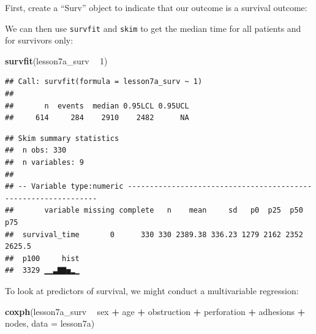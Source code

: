 \documentclass[]{book}
\newenvironment{Shaded}{\begin{snugshade}}{\end{snugshade}}
\newcommand{\DataTypeTok}[1]{\textcolor[rgb]{0.13,0.29,0.53}{#1}}
\newcommand{\DecValTok}[1]{\textcolor[rgb]{0.00,0.00,0.81}{#1}}
\newcommand{\KeywordTok}[1]{\textcolor[rgb]{0.13,0.29,0.53}{\textbf{#1}}}
\newcommand{\NormalTok}[1]{#1}
\newcommand{\OperatorTok}[1]{\textcolor[rgb]{0.81,0.36,0.00}{\textbf{#1}}}
\newcommand{\StringTok}[1]{\textcolor[rgb]{0.31,0.60,0.02}{#1}}
\begin{document}
First, create a ``Surv'' object to indicate that our outcome is a survival outcome:

\begin{Shaded}
\end{Shaded}

We can then use \texttt{survfit} and \texttt{skim} to get the median time for all patients and for survivors only:

\begin{Shaded}
\begin{Highlighting}[]
\KeywordTok{survfit}\NormalTok{(lesson7a_surv }\OperatorTok{~}\StringTok{ }\DecValTok{1}\NormalTok{)}
\end{Highlighting}
\end{Shaded}

\begin{verbatim}
## Call: survfit(formula = lesson7a_surv ~ 1)
## 
##       n  events  median 0.95LCL 0.95UCL 
##     614     284    2910    2482      NA
\end{verbatim}

\begin{Shaded}
\end{Shaded}

\begin{verbatim}
## Skim summary statistics
##  n obs: 330 
##  n variables: 9 
## 
## -- Variable type:numeric ---------------------------------------------------------------
##       variable missing complete   n    mean     sd   p0  p25  p50    p75
##  survival_time       0      330 330 2389.38 336.23 1279 2162 2352 2625.5
##  p100     hist
##  3329 ▁▁▃▇▇▅▂▁
\end{verbatim}

To look at predictors of survival, we might conduct a multivariable regression:

\begin{Shaded}
\begin{Highlighting}[]
\KeywordTok{coxph}\NormalTok{(lesson7a_surv }\OperatorTok{~}\StringTok{ }\NormalTok{sex }\OperatorTok{+}\StringTok{ }\NormalTok{age }\OperatorTok{+}\StringTok{ }\NormalTok{obstruction }\OperatorTok{+}\StringTok{ }\NormalTok{perforation }\OperatorTok{+}\StringTok{ }\NormalTok{adhesions }\OperatorTok{+}\StringTok{ }\NormalTok{nodes, }\DataTypeTok{data =}\NormalTok{ lesson7a)}
\end{Highlighting}
\end{Shaded}
\end{document}
